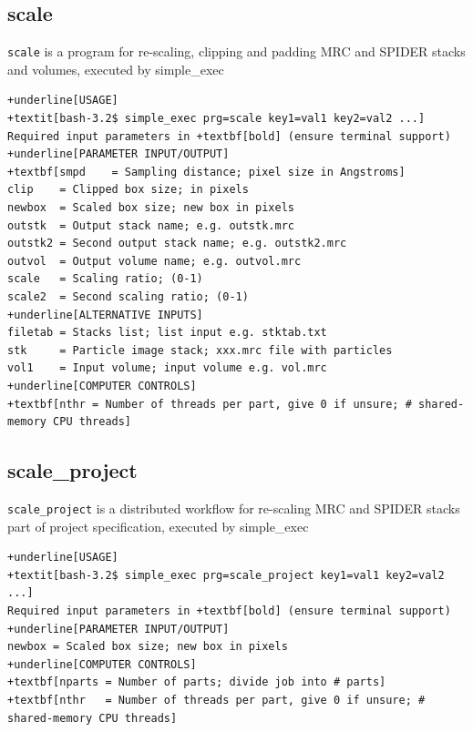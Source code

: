 \documentclass[a4paper,11pt]{article}
\newcommand{\prgname}[1]{\textcolor{NavyBlue}{\texttt{#1}}}
\begin{document}
\subsection{scale}
\label{scale}
\prgname{scale} is a program for re-scaling, clipping and padding MRC and SPIDER stacks and volumes, executed by simple\_exec
\begin{Verbatim}[commandchars=+\[\],fontsize=\small,breaklines=true]
+underline[USAGE]
+textit[bash-3.2$ simple_exec prg=scale key1=val1 key2=val2 ...]
Required input parameters in +textbf[bold] (ensure terminal support)
+underline[PARAMETER INPUT/OUTPUT]
+textbf[smpd    = Sampling distance; pixel size in Angstroms]
clip    = Clipped box size; in pixels
newbox  = Scaled box size; new box in pixels
outstk  = Output stack name; e.g. outstk.mrc
outstk2 = Second output stack name; e.g. outstk2.mrc
outvol  = Output volume name; e.g. outvol.mrc
scale   = Scaling ratio; (0-1)
scale2  = Second scaling ratio; (0-1)
+underline[ALTERNATIVE INPUTS]
filetab = Stacks list; list input e.g. stktab.txt
stk     = Particle image stack; xxx.mrc file with particles
vol1    = Input volume; input volume e.g. vol.mrc
+underline[COMPUTER CONTROLS]
+textbf[nthr = Number of threads per part, give 0 if unsure; # shared-memory CPU threads]
\end{Verbatim}

\subsection{scale\_project}
\label{scale_project}
\prgname{scale\_project} is a distributed workflow for re-scaling MRC and SPIDER stacks part of project specification, executed by simple\_exec
\begin{Verbatim}[commandchars=+\[\],fontsize=\small,breaklines=true]
+underline[USAGE]
+textit[bash-3.2$ simple_exec prg=scale_project key1=val1 key2=val2 ...]
Required input parameters in +textbf[bold] (ensure terminal support)
+underline[PARAMETER INPUT/OUTPUT]
newbox = Scaled box size; new box in pixels
+underline[COMPUTER CONTROLS]
+textbf[nparts = Number of parts; divide job into # parts]
+textbf[nthr   = Number of threads per part, give 0 if unsure; # shared-memory CPU threads]
\end{Verbatim}
\end{document}
